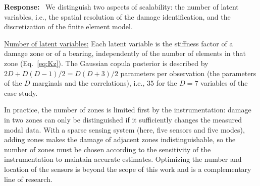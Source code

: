 \documentclass[11pt]{article}
\newenvironment{response}{\par\smallskip\noindent\color{resp}\textbf{Response:}\ }{\par}
\begin{document}
\begin{response}
We distinguish two aspects of scalability: the number of latent variables, i.e., the spatial resolution of the damage identification, and the discretization of the finite element model.

\underline{Number of latent variables:} 
Each latent variable is the stiffness factor of a damage zone or of a bearing, independently of the number of elements in that zone (Eq.~\eqref{eq:Kz}). 
The Gaussian copula posterior is described by $2D+D(D-1)/2=D(D+3)/2$ parameters per observation (the parameters of the $D$ marginals and the correlations), i.e., 35 for the $D=7$ variables of the case study. 

In practice, the number of zones is limited first by the instrumentation: damage in two zones can only be distinguished if it sufficiently changes the measured modal data. 
With a sparse sensing system (here, five sensors and five modes), adding zones makes the damage of adjacent zones indistinguishable, so the number of zones must be chosen according to the sensitivity of the instrumentation to maintain accurate estimates. Optimizing the number and location of the sensors is beyond the scope of this work and is  a complementary line of research.


\end{response}
\end{document}
